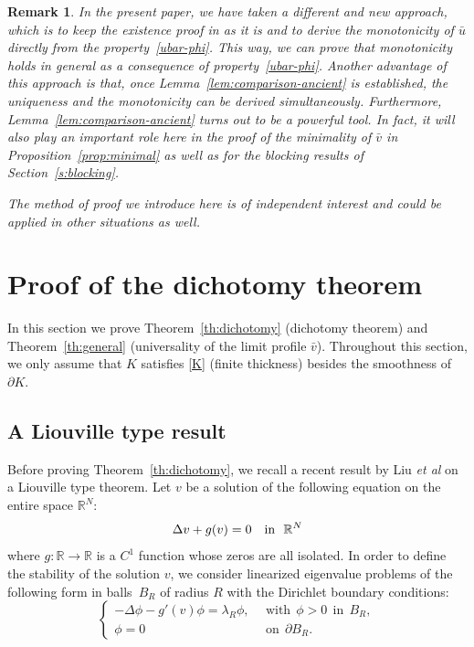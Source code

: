 \documentclass[a4paper,12pt,fullpage]{article}
\numberwithin{equation}{section}
\newtheorem{Rk}[Lemma]{Remark}
\newcommand{\be}{\begin{equation}}
\newcommand{\ee}{\end{equation}}
\def\R{{\mathbb R}}
\begin{document}
\begin{Rk}
In the present paper, we have taken a different and new approach, which is to keep the existence proof in \cite{BHM1} as it is and to derive the monotonicity of $\bar{u}$ directly from the property~\eqref{ubar-phi}. This way, we can prove that monotonicity holds in general as a consequence of property~\eqref{ubar-phi}. Another advantage of this approach is that, once Lemma~\ref{lem:comparison-ancient} is established, the uniqueness and the monotonicity can be derived simultaneously. Furthermore, Lemma~\ref{lem:comparison-ancient} turns out to be a powerful tool. In fact,  it will also play an important role here in the proof of the minimality of $\bar{v}$ in Proposition~\ref{prop:minimal} as well as for the blocking results of Section~\ref{s:blocking}.

The method of proof we introduce here is of independent interest and could be applied in other situations as well.
\end{Rk}


\section{Proof of the dichotomy theorem}\label{s:dichotomy-proof}

In this section we prove Theorem~\ref{th:dichotomy} (dichotomy theorem) and Theorem~\ref{th:general} (universality of the limit profile $\bar{v}$). Throughout this section, we only assume that $K$ satisfies \eqref{K} (finite thickness) besides the smoothness of $\partial K$.


\subsection{A Liouville type result}

Before proving Theorem~\ref{th:dichotomy}, we recall a recent result by Liu {\it et al} \cite{LWWW} on a Liouville type theorem. Let $v$ be a solution of the following equation on the entire space $\R^N$:
\begin{equation}\label{semil}
\Delta v + g(v)=0 \ \ \ \hbox{in} \ \ \R^N
\end{equation}
where $g:\R\to\R$ is a $C^1$ function whose zeros are all isolated. In order to define the stability of the solution $v$, we consider linearized eigenvalue problems of the following form in balls~$B_{R}$ of radius $R$ with the Dirichlet boundary conditions:
\be\label{linearized}
\left\{
\begin{array}{ll}
- \Delta \phi -  g'(v) \phi = \lambda_{R} \phi , \ \ &\text{with} \ \ \phi>0 \ \ \text{in} \ \ B_{R} , \\[4pt]
\phi = 0 \ \ &\text{on} \ \ \partial B_{R}.
\end{array}\right. 
\ee
\end{document}
